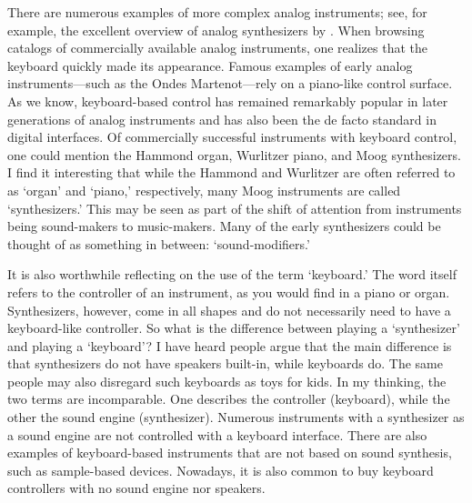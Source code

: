 There are numerous examples of more complex analog instruments; see, for example, the excellent overview of analog synthesizers by \citet{jenkins_analog_2007}. When browsing catalogs of commercially available analog instruments, one realizes that the keyboard quickly made its appearance. Famous examples of early analog instruments---such as the Ondes Martenot---rely on a piano-like control surface. As we know, keyboard-based control has remained remarkably popular in later generations of analog instruments and has also been the de facto standard in digital interfaces. Of commercially successful instruments with keyboard control, one could mention the Hammond organ, Wurlitzer piano, and Moog synthesizers. I find it interesting that while the Hammond and Wurlitzer are often referred to as `organ' and `piano,' respectively, many Moog instruments are called `synthesizers.' This may be seen as part of the shift of attention from instruments being sound-makers to music-makers. Many of the early synthesizers could be thought of as something in between: `sound-modifiers.'

It is also worthwhile reflecting on the use of the term `keyboard.' The word itself refers to the controller of an instrument, as you would find in a piano or organ. Synthesizers, however, come in all shapes and do not necessarily need to have a keyboard-like controller. So what is the difference between playing a `synthesizer' and playing a `keyboard'? I have heard people argue that the main difference is that synthesizers do not have speakers built-in, while keyboards do. The same people may also disregard such keyboards as toys for kids. In my thinking, the two terms are incomparable. One describes the controller (keyboard), while the other the sound engine (synthesizer). Numerous instruments with a synthesizer as a sound engine are not controlled with a keyboard interface. There are also examples of keyboard-based instruments that are not based on sound synthesis, such as sample-based devices. Nowadays, it is also common to buy keyboard controllers with no sound engine nor speakers.

